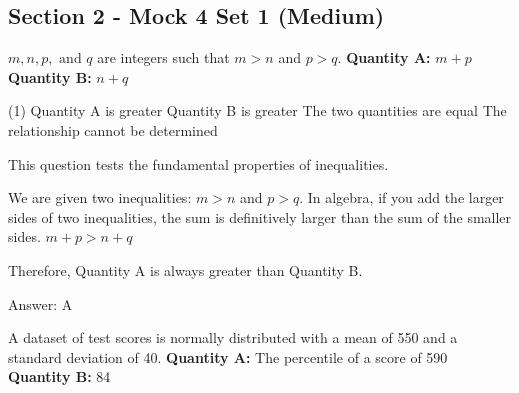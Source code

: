 \documentclass[11pt,paper=a4,answers]{exam}
\begin{document}
\begin{questions}
\pointsinrightmargin
\pointsdroppedatright
\marksnotpoints
{}
\pointformat{\boldmath\themarginpoints}
\bracketedpoints

\section*{Section 2 - Mock 4 Set 1 (Medium)}


\question
$m, n, p, \text{ and } q$ are integers such that $m > n$ and $p > q$.
\vspace{5pt}
\textbf{Quantity A: } $m + p$ \\
\vspace{5pt}
\textbf{Quantity B: } $n + q$

\begin{tasks}(1)
\task[A)] Quantity A is greater
\task[B)] Quantity B is greater
\task[C)] The two quantities are equal
\task[D)] The relationship cannot be determined
\end{tasks}

\begin{solution}
This question tests the fundamental properties of inequalities.
\vspace{5pt}
\begin{center}
We are given two inequalities: $m > n$ and $p > q$.
\vspace{5pt}
In algebra, if you add the larger sides of two inequalities, the sum is definitively larger than the sum of the smaller sides.
\vspace{5pt}
$m + p > n + q$
\end{center}
\vspace{5pt}
Therefore, Quantity A is always greater than Quantity B.

Answer: \colorbox{yellow!100}{A}
\end{solution}

\vspace{1cm}

\question
A dataset of test scores is normally distributed with a mean of 550 and a standard deviation of 40.
\vspace{5pt}
\textbf{Quantity A: } The percentile of a score of 590 \\
\vspace{5pt}
\textbf{Quantity B: } 84


\end{questions}
\end{document}
